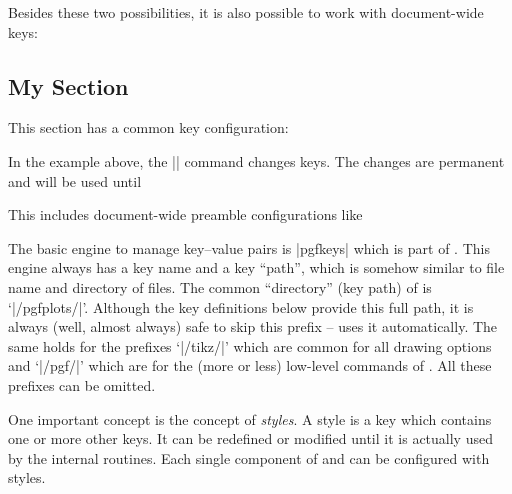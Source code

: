 Besides these two possibilities, it is also possible to work with document-wide
keys:
%
\begin{codeexample}
\chapter{My Section}
\pgfplotsset{
    key=value,
    key2=value2,
}
This section has a common key configuration:
\end{codeexample}
%
\noindent In the example above, the |\pgfplotsset| command changes keys. The
changes are permanent and will be used until
%
\begin{itemize}
    \item you redefine them or
    \item the current environment (like |\end{figure}|) is ended or
    \item \TeX{} encounters a closing brace `|}|'.
\end{itemize}
%
This includes document-wide preamble configurations like
%

The basic engine to manage key--value pairs is |pgfkeys| which is part of
\pgfname{}. This engine always has a key name and a key ``path'', which is
somehow similar to file name and directory of files. The common ``directory''
(key path) of \PGFPlots{} is `|/pgfplots/|'. Although the key definitions below
provide this full path, it is always (well, almost always) safe to skip this
prefix -- \PGFPlots{} uses it automatically. The same holds for the prefixes
`|/tikz/|' which are common for all \Tikz{} drawing options and `|/pgf/|' which
are for the (more or less) low-level commands of \pgfname{}. All these prefixes
can be omitted.

One important concept is the concept of \emph{styles}. A style is a key which
contains one or more other keys. It can be redefined or modified until it is
actually used by the internal routines. Each single component of \Tikz{} and
\PGFPlots{} can be configured with styles.

